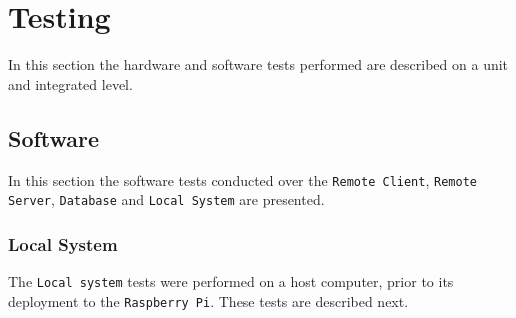 \chapter{Testing}
\label{cha:testing}
In this section the hardware and software tests performed are described on a
unit and integrated level.





\section{Software}
\label{sec:software}
In this section the software tests conducted over the \texttt{Remote Client},
\texttt{Remote Server}, \texttt{Database} and \texttt{Local System} are presented.

\subsection{Local System}
\label{sec:local-system}
The \texttt{Local system} tests were performed on a host computer, prior to its
deployment to the \texttt{Raspberry Pi}. These tests are described next.

